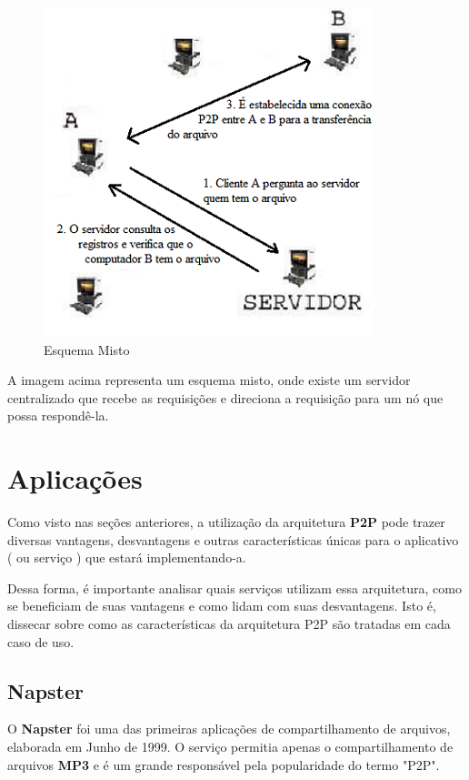 \documentclass[a4paper]{article}
\begin{document}
\begin{figure} [!ht]
\begin{center}
  \includegraphics{img//misto.png}
  \caption{Esquema Misto \cite{sisp2p}} 
\end{center}
\end{figure}
A imagem acima representa um esquema misto, onde existe um servidor centralizado que recebe as requisições e direciona a requisição para um nó que possa respondê-la.

\newpage

\section{Aplicações}
Como visto nas seções anteriores, a utilização da arquitetura \textbf{P2P} pode trazer diversas vantagens, desvantagens e outras características únicas para o aplicativo ( ou serviço ) que estará implementando-a. 

Dessa forma, é importante analisar quais serviços utilizam essa arquitetura, como se beneficiam de suas vantagens e como lidam com suas desvantagens. Isto é, dissecar sobre como as características da arquitetura P2P são tratadas em cada caso de uso.
\subsection{Napster}
O \textbf{Napster} foi uma das primeiras aplicações de compartilhamento de arquivos, elaborada em Junho de 1999. O serviço permitia apenas o compartilhamento de arquivos \textbf{MP3} e é um grande responsável pela popularidade do termo "P2P".
\end{document}
